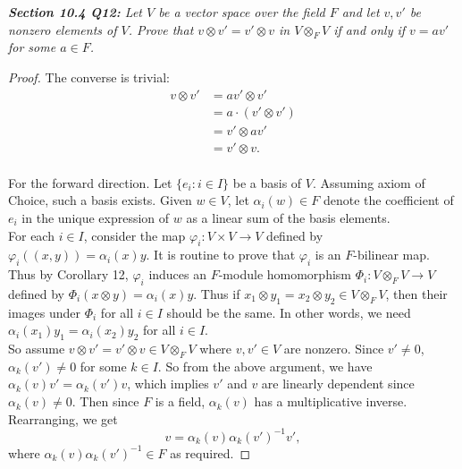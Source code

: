 \documentclass{article}
\begin{document}
\it \textbf{Section 10.4 Q12:} Let $V$ be a vector space over the field $F$
  and let $v,v'$ be nonzero elements of $V$. Prove that $v\otimes
  v'=v'\otimes v$ in $V\otimes_F V$ if and only if $v=av'$ for some $a\in
  F$.

  \begin{proof}
    The converse is trivial:
    \begin{align*}
      v\otimes v' &=av'\otimes v'\\
      &=a\cdot(v'\otimes v')\\
      &=v'\otimes av'\\
      &=v'\otimes v.\\
    \end{align*}

    For the forward direction. Let $\{e_i:i\in I\}$ be a
    basis of $V$. Assuming axiom of Choice, such a basis exists. Given
    $w\in V$, let $\alpha_i(w)\in F$ denote the coefficient of $e_i$ in the
    unique expression of $w$ as a linear sum of the basis elements. \\

    For each $i\in I$, consider the map $\varphi_i:V\times V\rightarrow V$
    defined by $\varphi_i((x,y))=\alpha_i(x)y$. It is routine to prove that
    $\varphi_i$ is an $F$-bilinear map. Thus by Corollary 12, $\varphi_i$
    induces an $F$-module homomorphism $\Phi_i:V\otimes_F V\rightarrow V$
    defined by $\Phi_i(x\otimes y)=\alpha_i(x)y$. Thus if $x_1\otimes
    y_1=x_2\otimes y_2\in V\otimes_F V$, then their images under $\Phi_i$
    for all $i\in I$ should be the same. In other words, we need
    $\alpha_i(x_1)y_1=\alpha_i(x_2)y_2$ for all $i\in I$. \\

    So assume $v\otimes v'=v'\otimes v \in V\otimes_F V$ where $v,v'\in V$
    are nonzero. Since $v'\neq0$, $\alpha_k(v')\neq0$ for some $k\in I$. So
    from the above argument, we have $\alpha_k(v)v'=\alpha_k(v')v$, which
    implies $v'$ and $v$ are linearly dependent since $\alpha_k(v)\neq0$.
    Then since $F$ is a field, $\alpha_k(v)$ has a multiplicative inverse.
    Rearranging, we get
    \[v=\alpha_k(v)\alpha_k(v')^{-1}v',\]
    where $\alpha_k(v)\alpha_k(v')^{-1} \in F$ as required.
  \end{proof}
\end{document}
